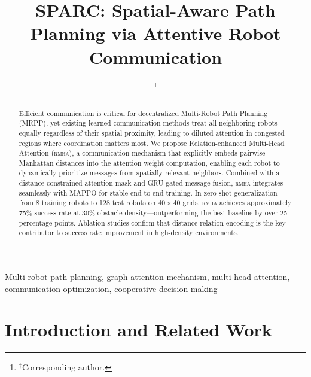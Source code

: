 \documentclass[conference]{IEEEtran}
\newcommand{\rmha}{\textsc{rmha}}
\begin{document}
\title{SPARC: Spatial-Aware Path Planning via Attentive Robot Communication}

\author{
\thanks{$^{\dagger}$Corresponding author.}
}

\maketitle

\begin{abstract}
Efficient communication is critical for decentralized Multi-Robot
Path Planning (MRPP), yet existing learned communication methods
treat all neighboring robots equally regardless of their spatial
proximity, leading to diluted attention in congested regions where
coordination matters most.
We propose Relation-enhanced Multi-Head Attention (\rmha), a
communication mechanism that explicitly embeds pairwise Manhattan
distances into the attention weight computation, enabling each
robot to dynamically prioritize messages from spatially relevant
neighbors.
Combined with a distance-constrained attention mask and GRU-gated
message fusion, \rmha{} integrates seamlessly with MAPPO for
stable end-to-end training.
In zero-shot generalization from 8 training robots to 128 test
robots on $40\!\times\!40$ grids, \rmha{} achieves approximately
75\% success rate at 30\% obstacle density---outperforming the
best baseline by over 25 percentage points.
Ablation studies confirm that distance-relation encoding is the
key contributor to success rate improvement in high-density
environments.
\end{abstract}

\begin{IEEEkeywords}
Multi-robot path planning, graph attention mechanism, multi-head
attention, communication optimization, cooperative decision-making
\end{IEEEkeywords}

\section{Introduction and Related Work}
\end{document}
